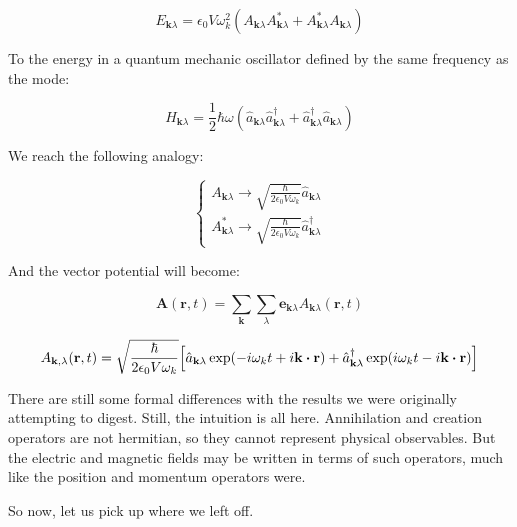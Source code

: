 \documentclass[12pt,a4paper]{report}
\begin{document}
\begin{equation}
    E_{\textbf{k}\lambda}=\epsilon_0 V\omega_k^2(A_{\textbf{k}\lambda}A^*_{\textbf{k}\lambda}+A^*_{\textbf{k}\lambda}A_{\textbf{k}\lambda})
\end{equation}

To the energy in a quantum mechanic oscillator defined by the same frequency as the mode:

\begin{equation}
    H_{\textbf{k}\lambda}=\frac{1}{2}\hbar\omega(\hat{a}_{\textbf{k}\lambda}\hat{a}_{\textbf{k}\lambda}^{\dag}+\hat{a}_{\textbf{k}\lambda}^{\dag}\hat{a}_{\textbf{k}\lambda})
\end{equation}

We reach the following analogy:

\begin{equation}
    \begin{cases}
        A_{\textbf{k}\lambda}\rightarrow\sqrt{\frac{\hbar}{2\epsilon_0V\omega_k}}\hat{a}_{\textbf{k}\lambda}\\[0.5cm]
        A^*_{\textbf{k}\lambda}\rightarrow\sqrt{\frac{\hbar}{2\epsilon_0V\omega_k}}\hat{a}^{\dag}_{\textbf{k}\lambda}
    \end{cases}
\end{equation}

And the vector potential will become:

\begin{equation}
    \textbf{A}(\textbf{r},t)=\sum_{\textbf{k}}\sum_{\lambda}\textbf{e}_{\textbf{k}\lambda} A_{\textbf{k}\lambda}(\textbf{r},t)
\end{equation}

\begin{equation}
    A_{\textbf{k},\lambda}(\textbf{r},t)=\sqrt{\frac{\hbar}{2\epsilon_0V\omega_k}}\Big[\hat{a}_{\textbf{k}\lambda}\exp(-i\omega_kt+i\textbf{k}\vdot\textbf{r})+\hat{a}^{\dag}_{\textbf{k}\lambda}\exp(i\omega_kt-i\textbf{k}\vdot\textbf{r})\Big]
\end{equation}

There are still some formal differences with the results we were originally attempting to digest. Still, the intuition is all here. Annihilation and creation operators are not hermitian, so they cannot represent physical observables. But the electric and magnetic fields may be written in terms of such operators, much like the position and momentum operators were.

So now, let us pick up where we left off.
\end{document}
